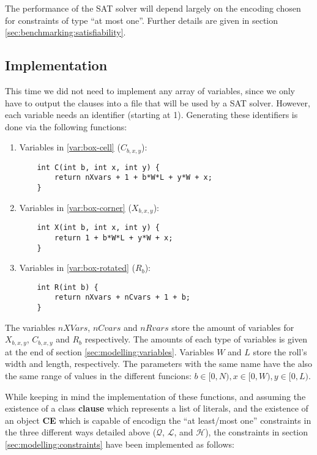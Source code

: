 The performance of the SAT solver will depend largely on the encoding chosen for
constraints of type ``at most one''. Further details are given in section
\ref{sec:benchmarking:satisfiability}.

\subsection{Implementation}
\label{sec:satisfiability:implementation}

This time we did not need to implement any array of variables, since
we only have to output the clauses into a file that will be used by a
SAT solver. However, each variable needs an identifier (starting at 1).
Generating these identifiers is done via the following functions:

\begin{enumerate}
	\item Variables in \ref{var:box-cell} ($C_{b,x,y}$):
    
	{\NOINDENT \begin{lstlisting}
	int C(int b, int x, int y) {
		return nXvars + 1 + b*W*L + y*W + x;
	}
	\end{lstlisting}}
    
	\item Variables in \ref{var:box-corner} ($X_{b,x,y}$):
    
	{\NOINDENT \begin{lstlisting}
	int X(int b, int x, int y) {
		return 1 + b*W*L + y*W + x;
	}
	\end{lstlisting}}
    
	\item Variables in \ref{var:box-rotated} ($R_b$):
    
	{\NOINDENT \begin{lstlisting}
	int R(int b) {
		return nXvars + nCvars + 1 + b;
	}
	\end{lstlisting}}
\end{enumerate}

The variables $nXVars$, $nCvars$ and $nRvars$ store the amount of
variables for $X_{b,x,y}$, $C_{b,x,y}$ and $R_b$ respectively. The
amounts of each type of variables is given at the end of section
\ref{sec:modelling:variables}. Variables $W$ and $L$ store the
roll's width and length, respectively. The parameters with the same
name have the also the same range of values in the different funcions:
$b\in[0,N), x\in[0,W), y\in[0,L)$.

\hfill

While keeping in mind the implementation of these functions, and
assuming the existence of a class \textbf{clause} which represents a list
of literals, and the existence of an object \textbf{CE} which is capable
of encodign the ``at least/most one'' constraints in the three
different ways detailed above ($\mathcal{Q}$, $\mathcal{L}$, and
$\mathcal{H}$), the constraints in section \ref{sec:modelling:constraints}
have been implemented as follows:

